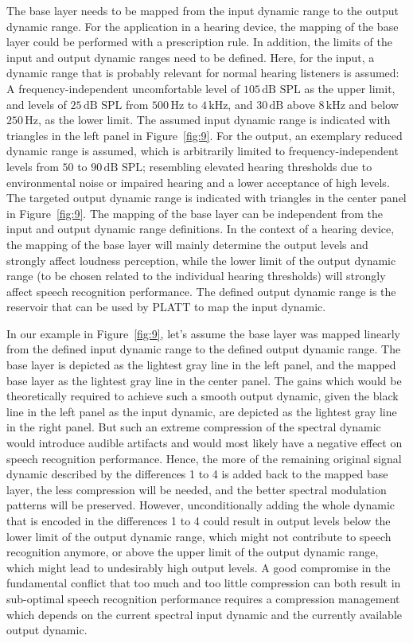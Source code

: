 \documentclass[10pt,a4paper,twocolumn]{article}
\begin{document}
The base layer needs to be mapped from the input dynamic range to the output dynamic range.
%
For the application in a hearing device, the mapping of the base layer could be performed with a prescription rule.
%
In addition, the limits of the input and output dynamic ranges need to be defined.
%
Here, for the input, a dynamic range that is probably relevant for normal hearing listeners is assumed: A frequency-independent uncomfortable level of $105\,\text{dB~SPL}$ as the upper limit, and levels of $25\,\text{dB~SPL}$ from $500\,\text{Hz}$ to $4\,\text{kHz}$, and $30\,\text{dB}$ above $8\,\text{kHz}$ and below $250\,\text{Hz}$, as the lower limit.
%
The assumed input dynamic range is indicated with triangles in the left panel in Figure~\ref{fig:9}.
%
For the output, an exemplary reduced dynamic range is assumed, which is arbitrarily limited to frequency-independent levels from $50$ to $90\,\text{dB~SPL}$; resembling elevated hearing thresholds due to environmental noise or impaired hearing and a lower acceptance of high levels.
%
The targeted output dynamic range is indicated with triangles in the center panel in Figure~\ref{fig:9}.
%
The mapping of the base layer can be independent from the input and output dynamic range definitions.
%
In the context of a hearing device, the mapping of the base layer will mainly determine the output levels and strongly affect loudness perception, while the lower limit of the output dynamic range (to be chosen related to the individual hearing thresholds) will strongly affect speech recognition performance.
%
The defined output dynamic range is the reservoir that can be used by PLATT to map the input dynamic.

In our example in Figure~\ref{fig:9}, let's assume the base layer was mapped linearly from the defined input dynamic range to the defined output dynamic range.
%
The base layer is depicted as the lightest gray line in the left panel, and the mapped base layer as the lightest gray line in the center panel.
%
The gains which would be theoretically required to achieve such a smooth output dynamic, given the black line in the left panel as the input dynamic, are depicted as the lightest gray line in the right panel.
%
But such an extreme compression of the spectral dynamic would introduce audible artifacts and would most likely have a negative effect on speech recognition performance.
%
Hence, the more of the remaining original signal dynamic described by the differences 1 to 4 is added back to the mapped base layer, the less compression will be needed, and the better spectral modulation patterns will be preserved.
%
However, unconditionally adding the whole dynamic that is encoded in the differences 1 to 4 could result in output levels below the lower limit of the output dynamic range, which might not contribute to speech recognition anymore, or above the upper limit of the output dynamic range, which might lead to undesirably high output levels.
%
A good compromise in the fundamental conflict that too much and too little compression can both result in sub-optimal speech recognition performance requires a compression management which depends on the current spectral input dynamic and the currently available output dynamic.
\end{document}
